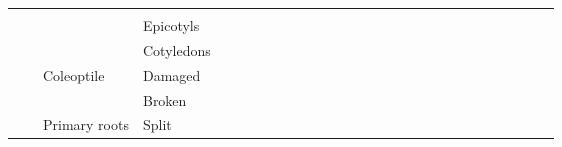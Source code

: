 \documentclass[12pt]{article}\usepackage[]{graphicx}\usepackage[]{color}
\begin{document}
\begin{table}[h]
{{\begin{minipage}{\textwidth}
\begin{tabular}{llllllllllllllllllllllllllll}
  \multicolumn{1}{l|}{} &
  \multicolumn{1}{l|}{} &
   &
   &
   &
   &
   &
   &
   &
   &
   &
   &
   \\ \cline{4-17}
\multicolumn{1}{|l|}{} &
  \multicolumn{1}{l|}{} &
  \multicolumn{1}{l|}{} &
  \multicolumn{1}{l|}{Epicotyls} &
  \multicolumn{1}{l|}{} &
  \multicolumn{1}{l|}{} &
  \multicolumn{1}{l|}{} &
  \multicolumn{1}{l|}{} &
  \multicolumn{1}{l|}{} &
  \multicolumn{1}{l|}{} &
  \multicolumn{1}{l|}{} &
  \multicolumn{1}{l|}{} &
  \multicolumn{1}{l|}{} &
  \multicolumn{1}{l|}{} &
  \multicolumn{1}{l|}{} &
  \multicolumn{1}{l|}{} &
  \multicolumn{1}{l|}{} &
   &
   &
   &
   &
   &
   &
   &
   &
   &
   &
   \\ \cline{4-17}
\multicolumn{1}{|l|}{} &
  \multicolumn{1}{l|}{} &
  \multicolumn{1}{l|}{} &
  \multicolumn{1}{l|}{Cotyledons} &
  \multicolumn{1}{l|}{} &
  \multicolumn{1}{l|}{} &
  \multicolumn{1}{l|}{} &
  \multicolumn{1}{l|}{} &
  \multicolumn{1}{l|}{} &
  \multicolumn{1}{l|}{} &
  \multicolumn{1}{l|}{} &
  \multicolumn{1}{l|}{} &
  \multicolumn{1}{l|}{} &
  \multicolumn{1}{l|}{} &
  \multicolumn{1}{l|}{} &
  \multicolumn{1}{l|}{} &
  \multicolumn{1}{l|}{} &
   &
   &
   &
   &
   &
   &
   &
   &
   &
   &
   \\ \cline{3-17}
\multicolumn{1}{|l|}{} &
  \multicolumn{1}{l|}{} &
  \multicolumn{1}{l|}{\multirow{2}{*}{Coleoptile}} &
  \multicolumn{1}{l|}{Damaged} &
  \multicolumn{1}{l|}{} &
  \multicolumn{1}{l|}{} &
  \multicolumn{1}{l|}{} &
  \multicolumn{1}{l|}{} &
  \multicolumn{1}{l|}{} &
  \multicolumn{1}{l|}{} &
  \multicolumn{1}{l|}{} &
  \multicolumn{1}{l|}{} &
  \multicolumn{1}{l|}{} &
  \multicolumn{1}{l|}{} &
  \multicolumn{1}{l|}{} &
  \multicolumn{1}{l|}{} &
  \multicolumn{1}{l|}{} &
   &
   &
   &
   &
   &
   &
   &
   &
   &
   &
   \\ \cline{4-17}
\multicolumn{1}{|l|}{} &
  \multicolumn{1}{l|}{} &
  \multicolumn{1}{l|}{} &
  \multicolumn{1}{l|}{Broken} &
  \multicolumn{1}{l|}{} &
  \multicolumn{1}{l|}{} &
  \multicolumn{1}{l|}{} &
  \multicolumn{1}{l|}{} &
  \multicolumn{1}{l|}{} &
  \multicolumn{1}{l|}{} &
  \multicolumn{1}{l|}{} &
  \multicolumn{1}{l|}{} &
  \multicolumn{1}{l|}{} &
  \multicolumn{1}{l|}{} &
  \multicolumn{1}{l|}{} &
  \multicolumn{1}{l|}{} &
  \multicolumn{1}{l|}{} &
   &
   &
   &
   &
   &
   &
   &
   &
   &
   &
   \\ \cline{3-17}
\multicolumn{1}{|l|}{} &
  \multicolumn{1}{l|}{} &
  \multicolumn{1}{l|}{\multirow{3}{*}{Primary roots}} &
  \multicolumn{1}{l|}{Split} &
  \multicolumn{1}{l|}{} &
  \multicolumn{1}{l|}{} &

\end{tabular}
\end{minipage}}}
\end{table}
\end{document}
